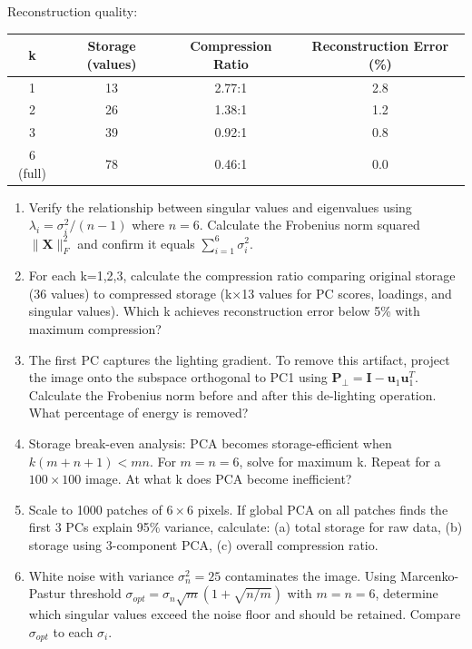 \documentclass[12pt]{article}
\begin{document}
Reconstruction quality:
\begin{center}
\begin{tabular}{cccc}
\toprule
k & Storage (values) & Compression Ratio & Reconstruction Error (\%) \\
\midrule
1 & 13 & 2.77:1 & 2.8 \\
2 & 26 & 1.38:1 & 1.2 \\
3 & 39 & 0.92:1 & 0.8 \\
6 (full) & 78 & 0.46:1 & 0.0 \\
\bottomrule
\end{tabular}
\end{center}

\begin{enumerate}[label=(\alph*)]
\item Verify the relationship between singular values and eigenvalues using $\lambda_i = \sigma_i^2/(n-1)$ where $n=6$. Calculate the Frobenius norm squared $\|\mathbf{X}\|_F^2$ and confirm it equals $\sum_{i=1}^{6} \sigma_i^2$.

\item For each k=1,2,3, calculate the compression ratio comparing original storage (36 values) to compressed storage (k×13 values for PC scores, loadings, and singular values). Which k achieves reconstruction error below 5\% with maximum compression?

\item The first PC captures the lighting gradient. To remove this artifact, project the image onto the subspace orthogonal to PC1 using $\mathbf{P}_{\perp} = \mathbf{I} - \mathbf{u}_1\mathbf{u}_1^T$. Calculate the Frobenius norm before and after this de-lighting operation. What percentage of energy is removed?

\item Storage break-even analysis: PCA becomes storage-efficient when $k(m + n + 1) < mn$. For $m=n=6$, solve for maximum k. Repeat for a $100 \times 100$ image. At what k does PCA become inefficient?

\item Scale to 1000 patches of $6 \times 6$ pixels. If global PCA on all patches finds the first 3 PCs explain 95\% variance, calculate: (a) total storage for raw data, (b) storage using 3-component PCA, (c) overall compression ratio.

\item White noise with variance $\sigma_n^2 = 25$ contaminates the image. Using Marcenko-Pastur threshold $\sigma_{opt} = \sigma_n\sqrt{m}(1 + \sqrt{n/m})$ with $m=n=6$, determine which singular values exceed the noise floor and should be retained. Compare $\sigma_{opt}$ to each $\sigma_i$.
\end{enumerate}
\end{document}

